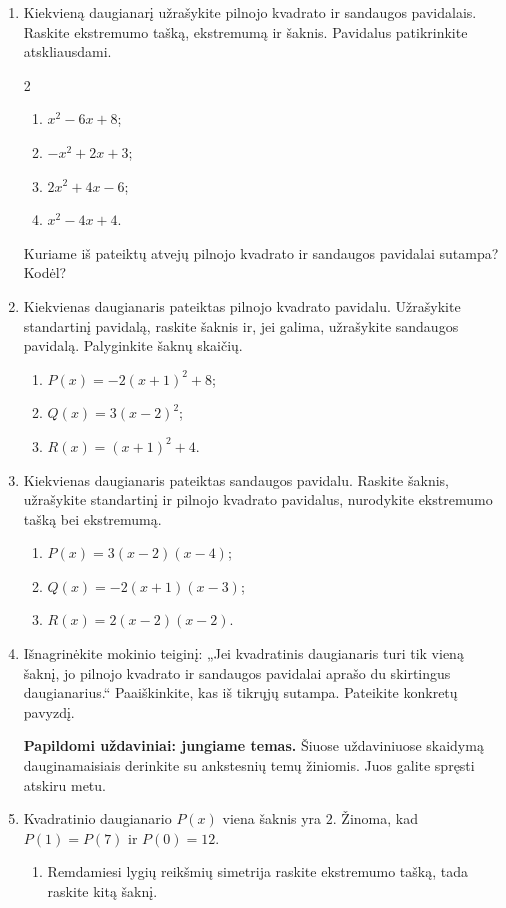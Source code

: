 \documentclass[12pt,a4paper]{article}
\begin{document}
\begin{enumerate}[series=uzdaviniai]
\begin{enumerate}
\end{enumerate}
\item Kiekvieną daugianarį užrašykite pilnojo kvadrato ir sandaugos pavidalais. Raskite ekstremumo tašką, ekstremumą ir šaknis. Pavidalus patikrinkite atskliausdami.
\begin{multicols}{2}\begin{enumerate}
\item $x^2-6x+8$; \item $-x^2+2x+3$; \item $2x^2+4x-6$; \item $x^2-4x+4$.
\end{enumerate}\end{multicols}
Kuriame iš pateiktų atvejų pilnojo kvadrato ir sandaugos pavidalai sutampa? Kodėl?
\item Kiekvienas daugianaris pateiktas pilnojo kvadrato pavidalu. Užrašykite standartinį pavidalą, raskite šaknis ir, jei galima, užrašykite sandaugos pavidalą. Palyginkite šaknų skaičių.
\begin{enumerate}
\item $P(x)=-2(x+1)^2+8$; \item $Q(x)=3(x-2)^2$; \item $R(x)=(x+1)^2+4$.
\end{enumerate}
\item Kiekvienas daugianaris pateiktas sandaugos pavidalu. Raskite šaknis, užrašykite standartinį ir pilnojo kvadrato pavidalus, nurodykite ekstremumo tašką bei ekstremumą.
\begin{enumerate}
\item $P(x)=3(x-2)(x-4)$; \item $Q(x)=-2(x+1)(x-3)$; \item $R(x)=2(x-2)(x-2)$.
\end{enumerate}
\item Išnagrinėkite mokinio teiginį: „Jei kvadratinis daugianaris turi tik vieną šaknį, jo pilnojo kvadrato ir sandaugos pavidalai aprašo du skirtingus daugianarius.“ Paaiškinkite, kas iš tikrųjų sutampa. Pateikite konkretų pavyzdį.
\par\medskip
\needspace{6cm}
\textbf{Papildomi uždaviniai: jungiame temas.} Šiuose uždaviniuose skaidymą dauginamaisiais derinkite su ankstesnių temų žiniomis. Juos galite spręsti atskiru metu.
\item Kvadratinio daugianario $P(x)$ viena šaknis yra $2$. Žinoma, kad $P(1)=P(7)$ ir $P(0)=12$.
\begin{enumerate}
\item Remdamiesi lygių reikšmių simetrija raskite ekstremumo tašką, tada raskite kitą šaknį.

\end{enumerate}
\end{enumerate}
\end{document}
